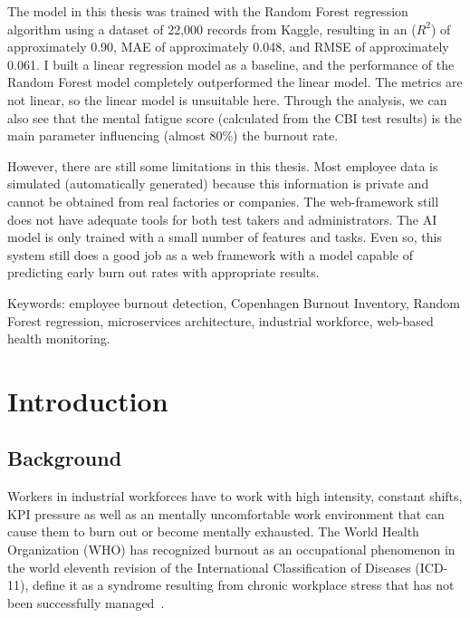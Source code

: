 \documentclass[12pt,a4paper]{article}
\begin{document}
The model in this thesis was trained with the Random Forest regression algorithm using a dataset of 22,000 records from Kaggle, resulting in an ($R^{2}$) of approximately 0.90, MAE of approximately 0.048, and RMSE of approximately 0.061. I built a linear regression model as a baseline, and the performance of the Random Forest model completely outperformed the linear model. The metrics are not linear, so the linear model is unsuitable here. Through the analysis, we can also see that the mental fatigue score (calculated from the CBI test results) is the main parameter influencing (almost 80\%) the burnout rate.

However, there are still some limitations in this thesis. Most employee data is simulated (automatically generated) because this information is private and cannot be obtained from real factories or companies. The web-framework still does not have adequate tools for both test takers and administrators. The AI model is only trained with a small number of features and tasks. Even so, this system still does a good job as a web framework with a model capable of predicting early burn out rates with appropriate results.

\bigskip
Keywords: employee burnout detection, Copenhagen Burnout
Inventory, Random Forest regression, microservices architecture, industrial
workforce, web-based health monitoring.


\newpage
{}
\setcounter{page}{1}
\section{Introduction}

\subsection{Background}

Workers in industrial workforces have to work with high intensity, constant shifts, KPI pressure as well as an mentally uncomfortable work environment that can cause them to burn out or become mentally exhausted. The World Health Organization (WHO) has recognized burnout as an occupational phenomenon in the world eleventh revision of the International Classification of Diseases (ICD-11),
define it as a syndrome resulting from chronic workplace stress that has
not been successfully managed~\cite{who2019}.
\end{document}
